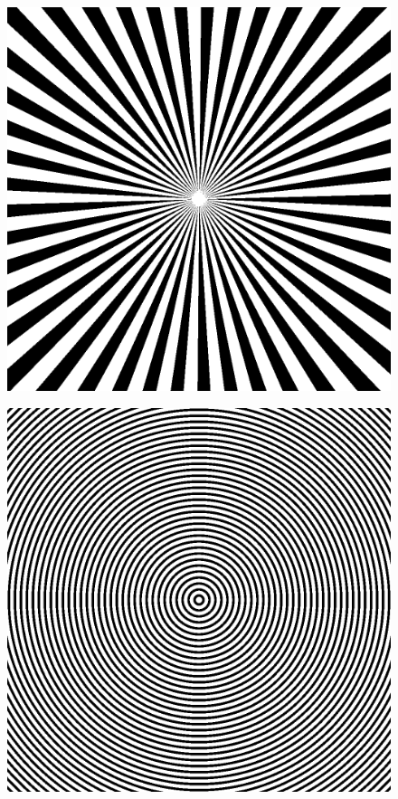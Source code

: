 \documentclass[twocolumn]{article}
\begin{document}
\begin{figure}
    \begin{center}
        \caption[]{}%
        \label{fig:rays}
        \href{run:plots/ray_flicker_1024_1024_4_4_0.gif}{\includegraphics[width=0.85\columnwidth]{plots/ray_static_1024_1024_4_4.png}}
    \end{center}
\end{figure}

\begin{figure}
    \begin{center}
        \caption[]{}%
        \label{fig:circles}
        \href{run:plots/circle_flicker_1024_1024_4_8_128.gif}{\includegraphics[width=0.85\columnwidth]{plots/circle_static_1024_1024_4_8.png}}
    \end{center}
\end{figure}
\end{document}
